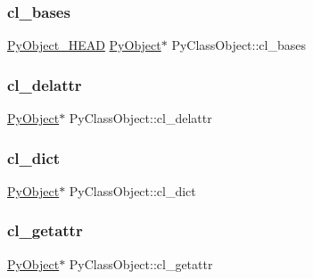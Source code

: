 \subsubsection{\texorpdfstring{cl\_bases}{cl\_bases}}
{\footnotesize\ttfamily \mbox{\hyperlink{_python27_2object_8h_a0bf35c1f3ea13f925de94d8593db3b7e}{Py\+Object\+\_\+\+H\+E\+AD}} \mbox{\hyperlink{_python27_2object_8h_aadc84ac7aed2cfa6f20c25f62bf3dac7}{Py\+Object}}$\ast$ Py\+Class\+Object\+::cl\+\_\+bases}

\mbox{\label{struct_py_class_object_a3b5435af0279356ff435c02bec59aa18}} 
\subsubsection{\texorpdfstring{cl\_delattr}{cl\_delattr}}
{\footnotesize\ttfamily \mbox{\hyperlink{_python27_2object_8h_aadc84ac7aed2cfa6f20c25f62bf3dac7}{Py\+Object}}$\ast$ Py\+Class\+Object\+::cl\+\_\+delattr}

\mbox{\label{struct_py_class_object_a75d42d7a8852488ef6a82316d17d7f99}} 
\subsubsection{\texorpdfstring{cl\_dict}{cl\_dict}}
{\footnotesize\ttfamily \mbox{\hyperlink{_python27_2object_8h_aadc84ac7aed2cfa6f20c25f62bf3dac7}{Py\+Object}}$\ast$ Py\+Class\+Object\+::cl\+\_\+dict}

\mbox{\label{struct_py_class_object_ac4b73e1e13fd4b552fa1a855f8c39e61}} 
\subsubsection{\texorpdfstring{cl\_getattr}{cl\_getattr}}
{\footnotesize\ttfamily \mbox{\hyperlink{_python27_2object_8h_aadc84ac7aed2cfa6f20c25f62bf3dac7}{Py\+Object}}$\ast$ Py\+Class\+Object\+::cl\+\_\+getattr}

\mbox{\label{struct_py_class_object_a46c243fe2ac225212f110a20bd154cc3}} 
